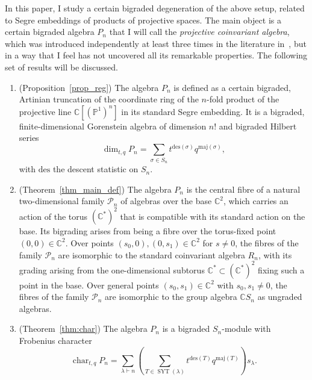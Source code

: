 \documentclass[a4paper,11pt]{amsart}
\theoremstyle{plain}
\theoremstyle{definition}
\newcommand{\C}{\mathbb{C}}
\newcommand{\CP}{\mathscr{P}}
\renewcommand{\P}{\mathbb{P}}
\DeclareMathOperator{\cha}{char}
\DeclareMathOperator{\SYT}{SYT}
\begin{document}
In this paper, I study a certain bigraded degeneration of the above setup, related to Segre embeddings of products of projective spaces. The main object is a certain bigraded algebra $P_n$ that I will call the {\em projective coinvariant algebra}, which was introduced independently at least three times
in the literature in~\cite{ORS, BO, AS}, but in a way that I feel has not uncovered all its remarkable properties. 
The following set of results will be discussed. 
\begin{enumerate}
\item[(a)] (Proposition~\ref{prop_reg}) The algebra $P_n$ is defined as a certain bigraded, Artinian truncation of the coordinate ring
of the $n$-fold product of the projective line $\C[(\P^1)^n]$ in its standard Segre embedding. It is a bigraded, 
finite-dimensional Gorenstein algebra of dimension $n!$ and bigraded Hilbert series
\begin{equation}\label{eq:Pntqdim}
\dim_{t,q} P_n = \sum_{\sigma\in S_n} t^{\mathrm{des}(\sigma)}q^{\mathrm{maj}(\sigma)}, 
\end{equation}
with $\mathrm{des}$ the descent statistic on $S_n$. 

\item[(b)] (Theorem~\ref{thm_main_def}) The algebra $P_n$ is the central fibre of a natural two-dimensional family $\CP_n$ of algebras over the base $\C^2$, 
which carries an action of the torus $(\C^*)^2$ that is compatible with its standard action on the base. Its bigrading
arises from being a fibre over the torus-fixed point $(0,0)\in\C^2$. Over points $(s_0,0), (0,s_1)\in\C^2$ for $s\neq0$, 
the fibres of the family $\CP_n$ are isomorphic to the standard coinvariant algebra $R_n$, with its grading arising from 
the one-dimensional subtorus $\C^*\subset(\C^*)^2$ fixing such a point in the base. Over general points 
$(s_0,s_1)\in\C^2$ with $s_0,s_1\neq0$, the fibres of the family $\CP_n$ are isomorphic to the group algebra $\C S_n$ as ungraded
algebras. 

\item[(c)] (Theorem~\ref{thm:char}) The algebra $P_n$ is a bigraded $S_n$-module with Frobenius character
\begin{equation}\label{eq:Pntqchar}
\cha_{t,q} P_n  =   \sum_{\lambda\vdash n} \left(\sum_{T\in\SYT(\lambda)} t^{\mathrm{des}(T)}q^{\mathrm{maj}(T)}\right)s_\lambda.
\end{equation}


\end{enumerate}
\end{document}
